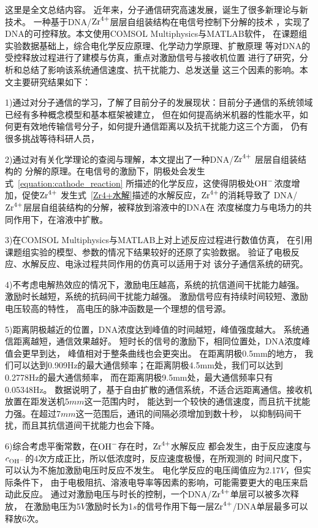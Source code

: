 
\begin{summary}
这里是全文总结内容。
近年来，分子通信研究高速发展，诞生了很多新理论与新技术。
一种基于DNA/$\ce{Zr^{4+}}$层层自组装结构在电信号控制下分解的技术
，实现了DNA的可控释放。本文使用COMSOL Multiphysics与MATLAB软件，
在课题组实验数据基础上，综合电化学反应原理、化学动力学原理、扩散原理
等对DNA的受控释放过程进行了建模与仿真，重点对激励信号与接收机位置
进行了研究，分析和总结了影响该系统通信速度、抗干扰能力、总发送量
这三个因素的影响。本文主要研究结果如下：

1)通过对分子通信的学习，了解了目前分子的发展现状：目前分子通信的系统领域已经有多种概念模型和基本框架被建立，
但在如何提高纳米机器的性能水平，如何更有效地传输信号分子，如何提升通信距离以及抗干扰能力这三个方面，
仍有很多挑战等待科研人员，

2)通过对有关化学理论的查阅与理解，本文提出了一种DNA/$\ce{Zr^{4+}}$
层层自组装结构的
分解的原理。在电信号的激励下，阴极处会发生式~\ref{equation:cathode_reaction}
所描述的化学反应，这使得阴极处$\ce{OH-}$浓度增加，促使$\ce{Zr^4+}$
发生式~\ref{Zr4+水解}描述的水解反应，$\ce{Zr^4+}$的消耗导致了
DNA/$\ce{Zr^{4+}}$层层自组装结构的分解，被释放到溶液中的DNA在
浓度梯度力与电场力的共同作用下，在溶液中扩散。

3)在COMSOL Multiphysics与MATLAB上对上述反应过程进行数值仿真，
在引用课题组实验的模型、参数的情况下结果较好的还原了实验数据。
验证了电极反应、水解反应、电泳过程共同作用的仿真可以适用于对
该分子通信系统的研究。

4)不考虑电解热效应的情况下，激励电压越高，系统的抗信道间干扰能力越强。
激励时长越短，系统的抗码间干扰能力越强。
激励信号应有持续时间较短、激励电压较高的特性，
高电压的脉冲函数是一个理想的信号源。

5)距离阴极越近的位置，DNA浓度达到峰值的时间越短，峰值强度越大。
系统通信距离越短，通信效果越好。
短时长的信号的激励下，相同位置处，DNA浓度峰值会更早到达，
峰值相对于整条曲线也会更突出。
在距离阴极0.5mm的地方，
我们可以达到0.909Hz的最大通信频率；在距离阴极4.5mm处，我们可以达到0.2778Hz的最大通信频率，
而在距离阴极9.5mm处，最大通信频率只有0.05348Hz。
数据说明了，基于自由扩散的通信系统，不适合远距离通信。接收机放置在距发送机5$mm$这一范围内时，
能达到一个较快的通信速度，而且抗干扰能力强。在超过7$mm$这一范围后，通讯的间隔必须增加到数十秒，
以抑制码间干扰，而且其抗信道间干扰能力也会下降。

6)综合考虑平衡常数，在$\ce{OH-}$存在时，$\ce{Zr^4+}$水解反应
都会发生，由于反应速度与$c_{\ce{OH-}}$的4次方成正比，所以低浓度时，反应速度极慢，在所观测的
时间尺度下，可以认为不施加激励电压时反应不发生。
电化学反应的电压阈值应为2.17$V$，但实际条件下，
由于电极阻抗、溶液电导率等因素的影响，可能需要更大的电压来启动此反应。
通过对激励电压与时长的控制，一个DNA/$\ce{Zr^4+}$单层可以被多次释放，
在激励电压为5$V$激励时长为1$s$的信号作用下每一层$\ce{Zr^4+}$/DNA单层最多可以释放6次。


\end{summary}
